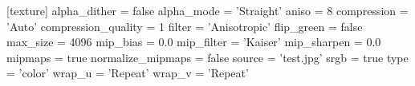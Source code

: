 [texture]
alpha_dither = false
alpha_mode = 'Straight'
aniso = 8
compression = 'Auto'
compression_quality = 1
filter = 'Anisotropic'
flip_green = false
max_size = 4096
mip_bias = 0.0
mip_filter = 'Kaiser'
mip_sharpen = 0.0
mipmaps = true
normalize_mipmaps = false
source = 'test.jpg'
srgb = true
type = 'color'
wrap_u = 'Repeat'
wrap_v = 'Repeat'